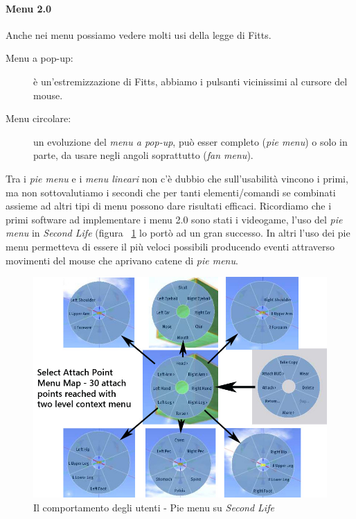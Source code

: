 				\paragraph{Menu 2.0}
					Anche nei menu possiamo vedere molti usi della legge di Fitts.
					\begin{description}
						\item[Menu a pop-up:] è un'estremizzazione di Fitts, abbiamo i pulsanti vicinissimi al cursore del mouse.
						\item[Menu circolare:] un evoluzione del \emph{menu a pop-up}, può esser completo (\emph{pie menu}) o solo in parte, da usare negli angoli soprattutto (\emph{fan menu}).
					\end{description}
					Tra i \emph{pie menu} e i \emph{menu lineari} non c'è dubbio che sull'usabilità vincono i primi, ma non sottovalutiamo i secondi che  per tanti elementi/comandi se combinati assieme ad altri tipi di menu possono dare risultati efficaci.
					Ricordiamo che i primi software ad implementare i menu 2.0 sono stati i videogame, l'uso del \emph{pie menu} in \emph{Second Life} (figura ~\ref{fig:PieMenu} lo portò ad un gran successo. In altri l'uso dei pie menu permetteva di essere il più veloci possibili producendo eventi attraverso movimenti del mouse che aprivano catene di \emph{pie menu}.
				
				\begin{figure}
				\centering
					\includegraphics[width=\textwidth]{images/IlComportamentoDegliUtenti-PieMenu}
					\caption{Il comportamento degli utenti - Pie menu su \emph{Second Life}}
					\label{fig:PieMenu}
				\end{figure}